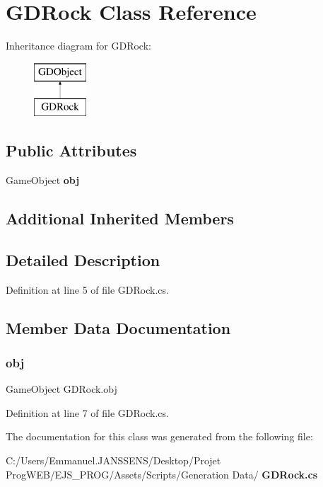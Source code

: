 \section{G\+D\+Rock Class Reference}
\label{class_g_d_rock}
Inheritance diagram for G\+D\+Rock\+:\begin{figure}[H]
\begin{center}
\leavevmode
\includegraphics[height=2.000000cm]{class_g_d_rock}
\end{center}
\end{figure}
\subsection*{Public Attributes}
\begin{DoxyCompactItemize}
\item 
Game\+Object \textbf{ obj}
\end{DoxyCompactItemize}
\subsection*{Additional Inherited Members}


\subsection{Detailed Description}


Definition at line 5 of file G\+D\+Rock.\+cs.



\subsection{Member Data Documentation}
\mbox{\label{class_g_d_rock_a8e516ccaa37d6d79254ade7136414c45}} 
\subsubsection{obj}
{\footnotesize\ttfamily Game\+Object G\+D\+Rock.\+obj}



Definition at line 7 of file G\+D\+Rock.\+cs.



The documentation for this class was generated from the following file\+:\begin{DoxyCompactItemize}
\item 
C\+:/\+Users/\+Emmanuel.\+J\+A\+N\+S\+S\+E\+N\+S/\+Desktop/\+Projet Prog\+W\+E\+B/\+E\+J\+S\+\_\+\+P\+R\+O\+G/\+Assets/\+Scripts/\+Generation Data/\textbf{ G\+D\+Rock.\+cs}\end{DoxyCompactItemize}
